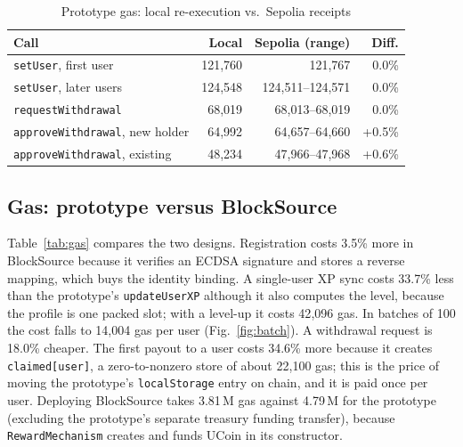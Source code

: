 \documentclass[conference]{IEEEtran}
\begin{document}
\begin{table}[t]
\centering
\caption{Prototype gas: local re-execution vs.\ Sepolia receipts}
\label{tab:validate}
\footnotesize
\setlength{\tabcolsep}{3pt}
\begin{tabular}{@{}lrrr@{}}
\toprule
\textbf{Call} & \textbf{Local} & \textbf{Sepolia (range)} & \textbf{Diff.}\\
\midrule
\texttt{setUser}, first user & 121{,}760 & 121{,}767 & 0.0\%\\
\texttt{setUser}, later users & 124{,}548 & 124{,}511--124{,}571 & 0.0\%\\
\texttt{requestWithdrawal} & 68{,}019 & 68{,}013--68{,}019 & 0.0\%\\
\texttt{approveWithdrawal}, new holder & 64{,}992 & 64{,}657--64{,}660 & +0.5\%\\
\texttt{approveWithdrawal}, existing & 48{,}234 & 47{,}966--47{,}968 & +0.6\%\\
\bottomrule
\end{tabular}
\end{table}

\subsection{Gas: prototype versus BlockSource}\label{sec:gas}
Table~\ref{tab:gas} compares the two designs. Registration costs 3.5\% more in BlockSource because it verifies an ECDSA signature and stores a reverse mapping, which buys the identity binding. A single-user XP sync costs 33.7\% less than the prototype's \texttt{updateUserXP} although it also computes the level, because the profile is one packed slot; with a level-up it costs 42{,}096 gas. In batches of 100 the cost falls to 14{,}004 gas per user (Fig.~\ref{fig:batch}). A withdrawal request is 18.0\% cheaper. The first payout to a user costs 34.6\% more because it creates \texttt{claimed[user]}, a zero-to-nonzero store of about 22{,}100 gas; this is the price of moving the prototype's \texttt{localStorage} entry on chain, and it is paid once per user. Deploying BlockSource takes 3.81\,M gas against 4.79\,M for the prototype (excluding the prototype's separate treasury funding transfer), because \texttt{RewardMechanism} creates and funds UCoin in its constructor.
\end{document}
